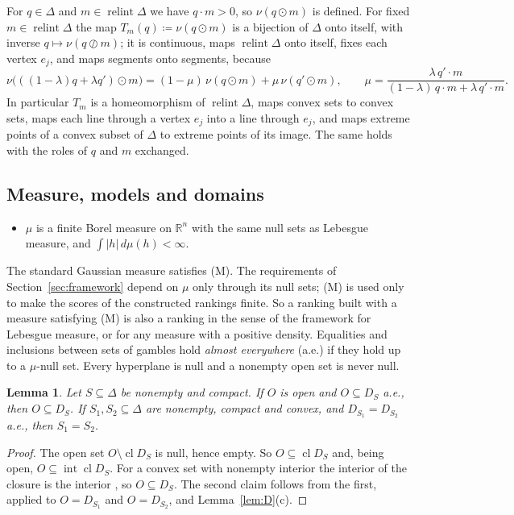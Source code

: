 \documentclass[11pt]{article}
\newcommand{\R}{\mathbb{R}}
\DeclareMathOperator{\relint}{relint}
\DeclareMathOperator{\cl}{cl}
\DeclareMathOperator{\inter}{int}
\theoremstyle{plain}
\newtheorem{lemma}[theorem]{Lemma}
\theoremstyle{definition}
\theoremstyle{remark}
\begin{document}
For $q\in\Delta$ and $m\in\relint\Delta$ we have $q\cdot m>0$, so $\nu(q\odot m)$ is
defined. For fixed $m\in\relint\Delta$ the map $T_m(q)\coloneqq\nu(q\odot m)$ is a bijection
of $\Delta$ onto itself, with inverse $q\mapsto\nu(q\oslash m)$; it is continuous, maps
$\relint\Delta$ onto itself, fixes each vertex $e_j$, and maps segments onto segments,
because
\begin{equation}\label{eq:proj}
  \nu\bigl(((1-\lambda)q+\lambda q')\odot m\bigr)=(1-\mu)\,\nu(q\odot m)+\mu\,\nu(q'\odot m),
  \qquad \mu=\frac{\lambda\, q'\cdot m}{(1-\lambda)\,q\cdot m+\lambda\,q'\cdot m}.
\end{equation}
In particular $T_m$ is a homeomorphism of $\relint\Delta$, maps convex sets to convex sets,
maps each line through a vertex $e_j$ into a line through $e_j$, and maps extreme points of
a convex subset of $\Delta$ to extreme points of its image. The same holds with the roles
of $q$ and $m$ exchanged.

\subsection{Measure, models and domains}

\begin{itemize}
  \item[(M)] $\mu$ is a finite Borel measure on $\R^n$ with the same null sets as Lebesgue
  measure, and $\int|h|\,d\mu(h)<\infty$.
\end{itemize}
The standard Gaussian measure satisfies (M). The requirements of
Section~\ref{sec:framework} depend on $\mu$ only through its null sets; (M) is used only to
make the scores of the constructed rankings finite. So a ranking built with a measure
satisfying (M) is also a ranking in the sense of the framework for Lebesgue measure, or
for any measure with a positive density. Equalities and inclusions between sets of
gambles hold \emph{almost everywhere} (a.e.) if they hold up to a $\mu$-null set. Every
hyperplane is null and a nonempty open set is never null.

\begin{lemma}\label{lem:open}
Let $S\subseteq\Delta$ be nonempty and compact. If $O$ is open and $O\subseteq D_S$
a.e., then $O\subseteq D_S$. If $S_1,S_2\subseteq\Delta$ are nonempty, compact and
convex, and $D_{S_1}=D_{S_2}$ a.e., then $S_1=S_2$.
\end{lemma}

\begin{proof}
The open set $O\setminus\cl D_S$ is null, hence empty. So $O\subseteq\cl D_S$ and, being
open, $O\subseteq\inter\cl D_S$. For a convex set with nonempty interior the interior of
the closure is the interior \cite[Thm.~6.3]{Rockafellar}, so $O\subseteq D_S$. The second
claim follows from the first, applied to $O=D_{S_1}$ and $O=D_{S_2}$, and
Lemma~\ref{lem:D}(c).
\end{proof}
\end{document}
